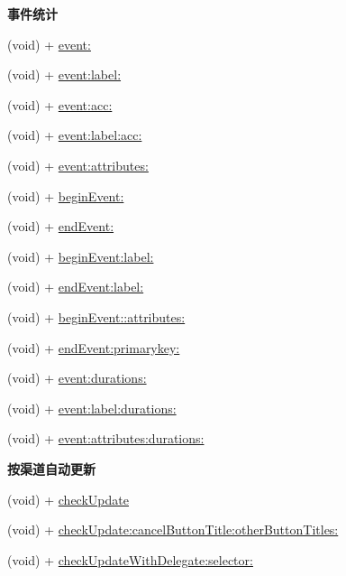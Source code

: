 \begin{Indent}\textbf{ 事件统计}\par
{\em 

 

 }\begin{DoxyCompactItemize}
\item 
(void) + \hyperlink{interfaceMobClick_a1e1c48199935a97e0d96562627821641}{event\+:}
\item 
(void) + \hyperlink{interfaceMobClick_a034f01f9ce387e1c984c8f22eaf50101}{event\+:label\+:}
\item 
(void) + \hyperlink{interfaceMobClick_ad9dcb79a396229084f94980bd5030abe}{event\+:acc\+:}
\item 
(void) + \hyperlink{interfaceMobClick_ab1cf1e7dbe11d6c5b0d2cc85eef3f1a9}{event\+:label\+:acc\+:}
\item 
(void) + \hyperlink{interfaceMobClick_acd198f68df6e9d7030081dfe302348c7}{event\+:attributes\+:}
\item 
(void) + \hyperlink{interfaceMobClick_adba75e0a140ccb8c895df344e4a8bdbc}{begin\+Event\+:}
\item 
(void) + \hyperlink{interfaceMobClick_a34af6442499678c6f6b5b46c8954cd7a}{end\+Event\+:}
\item 
(void) + \hyperlink{interfaceMobClick_a7e22315d3d309120861bc8cff05d619d}{begin\+Event\+:label\+:}
\item 
(void) + \hyperlink{interfaceMobClick_a989f2b9e8f0661036f8956aee786bef0}{end\+Event\+:label\+:}
\item 
(void) + \hyperlink{interfaceMobClick_a36c03a6e9b8958b5f8d03f31a27c84fa}{begin\+Event\+::attributes\+:}
\item 
(void) + \hyperlink{interfaceMobClick_a7e1a02ba6cbbdd7dabb1dfde800560bb}{end\+Event\+:primarykey\+:}
\item 
(void) + \hyperlink{interfaceMobClick_ab4e28c81cca47af267c814b0e4a3b002}{event\+:durations\+:}
\item 
(void) + \hyperlink{interfaceMobClick_a190a123c20da553d3719ceefd00fd619}{event\+:label\+:durations\+:}
\item 
(void) + \hyperlink{interfaceMobClick_a059825fd394ee24bb0e6713e5314de7f}{event\+:attributes\+:durations\+:}
\end{DoxyCompactItemize}
\end{Indent}
\begin{Indent}\textbf{ 按渠道自动更新}\par
{\em 

 

 }\begin{DoxyCompactItemize}
\item 
(void) + \hyperlink{interfaceMobClick_af449f6d1578c8c8c81b0b766c30f7589}{check\+Update}
\item 
(void) + \hyperlink{interfaceMobClick_a3e3c2733c387fb545667347becfdd3d3}{check\+Update\+:cancel\+Button\+Title\+:other\+Button\+Titles\+:}
\item 
(void) + \hyperlink{interfaceMobClick_a7c7add7b5376a318e5b3ac995a0e4f85}{check\+Update\+With\+Delegate\+:selector\+:}
\end{DoxyCompactItemize}
\end{Indent}
